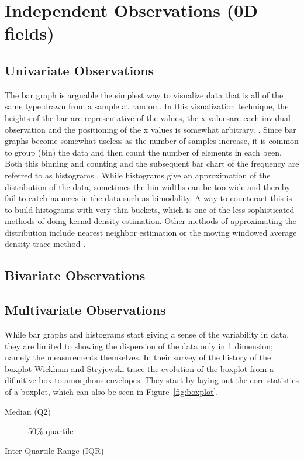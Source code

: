 \documentclass[../main.tex]{subfiles}
\begin{document}
\section{Independent Observations (0D fields)}


\subsection{Univariate Observations}

The bar graph is arguable the simplest way to visualize data that is all of the
same type drawn from a sample at random. In this visualization technique, the
heights of the bar are representative of the values, the x valuesare each
invidual observation and the positioning of the x values is somewhat
arbitrary. \cite{TufteVisualDIsplay, Friendly, Playfair}. Since bar
graphs become somewhat useless as the number of samples increase, it is common
to group (bin) the data and then count the number of elements in each
been. Both this binning and counting and the subsequent bar chart of the
frequency are referred to as histograms \cite{ioannidis2003}. While histograms
give an approximation of the distribution of the data, sometimes the bin widths
can be too wide and thereby fail to catch naunces in the data such as
bimodality. A way to counteract this is to build histograms with very thin
buckets, which is one of the less sophisticated methods of doing kernal density
estimation. Other methods of approximating the distribution include nearest
neighbor estimation or the  moving windowed average density trace method \cite{chambers1983}.


\subsection{Bivariate Observations}
\subsection{Multivariate Observations}
While bar graphs and histograms start giving a sense of the variability in
data, they are limited to showing the dispersion of the data only in 1
dimension; namely the measurements themselves. In their survey of the history
of the boxplot \cite{wickham2011} Wickham and Stryjewski trace the evolution of
the boxplot from a difinitive box to amorphous envelopes.  They start by laying
out
the core statistics of a boxplot, which can also be seen in
Figure~\ref{fig:boxplot}.
\begin{description}
\item[Median (Q2)] 50\% quartile
\item[Inter Quartile Range (IQR)]
\end{description}
\end{document}
